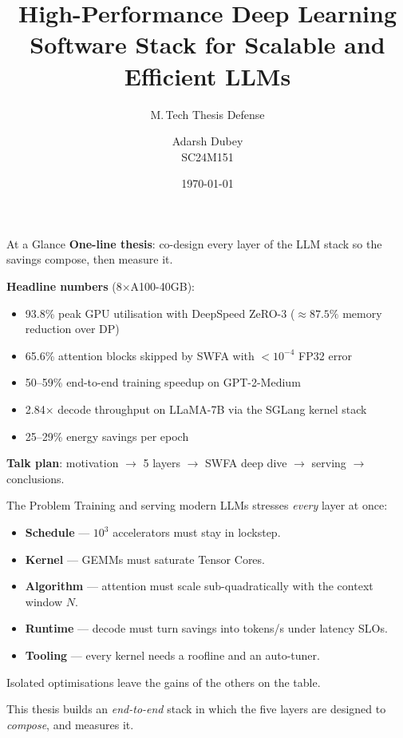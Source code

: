 \documentclass[10pt,aspectratio=169]{beamer}
\title[HPC-DL Stack for LLMs]%
      {High-Performance Deep Learning\\Software Stack for Scalable and
       Efficient LLMs}
\subtitle{M.\,Tech Thesis Defense}
\author[Adarsh Dubey]{Adarsh Dubey \\ \scriptsize SC24M151}
\institute[IIST]{Department of Mathematics\\
                 Indian Institute of Space Science and Technology\\
                 Advisor: Dr.~S.~Sumitra}
\date{\today}
\begin{document}

\begin{frame}[plain]
  \titlepage
\end{frame}

\begin{frame}{At a Glance}
  \textbf{One-line thesis}: co-design every layer of the LLM stack so
  the savings compose, then measure it.
  \vspace{1.5ex}

  \textbf{Headline numbers} (8$\times$A100-40GB):
  \begin{itemize}
    \item \alert{93.8\%} peak GPU utilisation with DeepSpeed ZeRO-3
          ($\approx 87.5\%$ memory reduction over DP)
    \item \alert{65.6\%} attention blocks skipped by SWFA with
          $<\!10^{-4}$ FP32 error
    \item \alert{50--59\%} end-to-end training speedup on GPT-2-Medium
    \item \alert{2.84$\times$} decode throughput on LLaMA-7B via the
          SGLang kernel stack
    \item \alert{25--29\%} energy savings per epoch
  \end{itemize}
  \vspace{1ex}
  \textbf{Talk plan}: motivation $\to$ 5 layers $\to$ SWFA deep dive $\to$
  serving $\to$ conclusions.
\end{frame}

\begin{frame}{The Problem}
  Training and serving modern LLMs stresses \emph{every} layer at once:
  \begin{itemize}
    \item \textbf{Schedule} — $10^3$ accelerators must stay in lockstep.
    \item \textbf{Kernel} — GEMMs must saturate Tensor Cores.
    \item \textbf{Algorithm} — attention must scale sub-quadratically with
          the context window $N$.
    \item \textbf{Runtime} — decode must turn savings into tokens/s
          under latency SLOs.
    \item \textbf{Tooling} — every kernel needs a roofline and an
          auto-tuner.
  \end{itemize}
  \vspace{1ex}
  \alert{Isolated optimisations leave the gains of the others on the
         table.}
  \vspace{2ex}

  This thesis builds an \emph{end-to-end} stack in which the five
  layers are designed to \emph{compose}, and measures it.
\end{frame}
\end{document}

